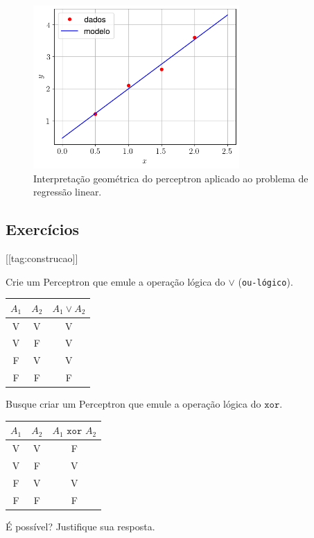\begin{figure}[H]
  \centering
  \includegraphics[width=0.7\textwidth]{./cap_perceptron/dados/fig_percep_mq/main}
  \caption{Interpretação geométrica do perceptron aplicado ao problema de regressão linear.}
  \label{fig:percep_mq}
\end{figure}

\subsection{Exercícios}
[[tag:construcao]]

\begin{exer}
  Crie um Perceptron que emule a operação lógica do $\lor$ (\texttt{ou-lógico}).
  \begin{center}
    \begin{tabular}{cc|c}
      $A_1$ & $A_2$ & $A_1\lor A_2$\\\hline
      V & V & V\\
      V & F & V\\
      F & V & V\\
      F & F & F\\\hline
    \end{tabular}
  \end{center}
\end{exer}

\begin{exer}
  Busque criar um Perceptron que emule a operação lógica do $\texttt{xor}$.
  \begin{center}
    \begin{tabular}{cc|c}
      $A_1$ & $A_2$ & $A_1\texttt{ xor }A_2$\\\hline
      V & V & F\\
      V & F & V\\
      F & V & V\\
      F & F & F\\\hline
    \end{tabular}
  \end{center}
  É possível? Justifique sua resposta.
\end{exer}

